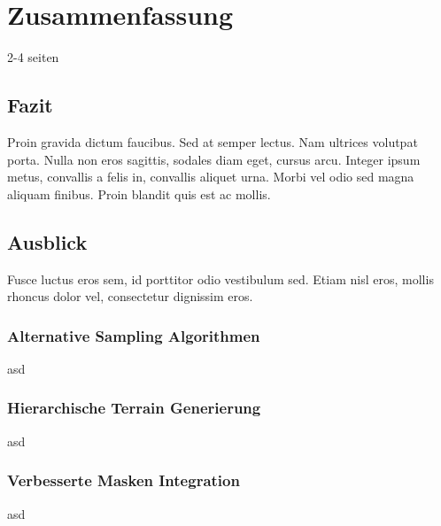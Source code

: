 \chapter{Zusammenfassung}
2-4 seiten

\section{Fazit}

Proin gravida dictum faucibus. Sed at semper lectus. Nam ultrices volutpat porta. Nulla non eros sagittis, sodales diam eget, cursus arcu. Integer ipsum metus, convallis a felis in, convallis aliquet urna. Morbi vel odio sed magna aliquam finibus. Proin blandit quis est ac mollis.\cite{join_study}

\section{Ausblick}

Fusce luctus eros sem, id porttitor odio vestibulum sed. Etiam nisl eros, mollis rhoncus dolor vel, consectetur dignissim eros. 

\subsection{Alternative Sampling Algorithmen}

asd


\subsection{Hierarchische Terrain Generierung}

asd




\subsection{Verbesserte Masken Integration}

asd


